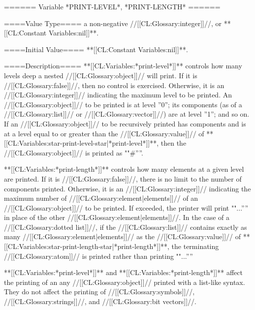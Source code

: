 ====== Variable *PRINT-LEVEL*, *PRINT-LENGTH* ======

====Value Type====
a non-negative //[[CL:Glossary:integer]]//, or **[[CL:Constant Variables:nil]]**.

====Initial Value====
**[[CL:Constant Variables:nil]]**.

====Description====
**[[CL:Variables:*print-level*]]** controls how many levels deep a nested //[[CL:Glossary:object]]// will print. If it is //[[CL:Glossary:false]]//, then no control is exercised. Otherwise, it is an //[[CL:Glossary:integer]]// indicating the maximum level to be printed. An //[[CL:Glossary:object]]// to be printed is at level ''0''; its components (as of a //[[CL:Glossary:list]]// or //[[CL:Glossary:vector]]//) are at level ''1''; and so on. If an //[[CL:Glossary:object]]// to be recursively printed has components and is at a level equal to or greater than the //[[CL:Glossary:value]]// of **[[CL:Variables:star-print-level-star|*print-level*]]**, then the //[[CL:Glossary:object]]// is printed as ""#''''.

**[[CL:Variables:*print-length*]]** controls how many elements at a given level are printed. If it is //[[CL:Glossary:false]]//, there is no limit to the number of components printed. Otherwise, it is an //[[CL:Glossary:integer]]// indicating the maximum number of //[[CL:Glossary:element|elements]]// of an //[[CL:Glossary:object]]// to be printed. If exceeded, the printer will print ""...'''' in place of the other //[[CL:Glossary:element|elements]]//. In the case of a //[[CL:Glossary:dotted list]]//, if the //[[CL:Glossary:list]]// contains exactly as many //[[CL:Glossary:element|elements]]// as the //[[CL:Glossary:value]]// of **[[CL:Variables:star-print-length-star|*print-length*]]**, the terminating //[[CL:Glossary:atom]]// is printed rather than printing ""...''''

**[[CL:Variables:*print-level*]]** and **[[CL:Variables:*print-length*]]** affect the printing of an any //[[CL:Glossary:object]]// printed with a list-like syntax. They do not affect the printing of //[[CL:Glossary:symbols]]//, //[[CL:Glossary:strings]]//, and //[[CL:Glossary:bit vectors]]//.

